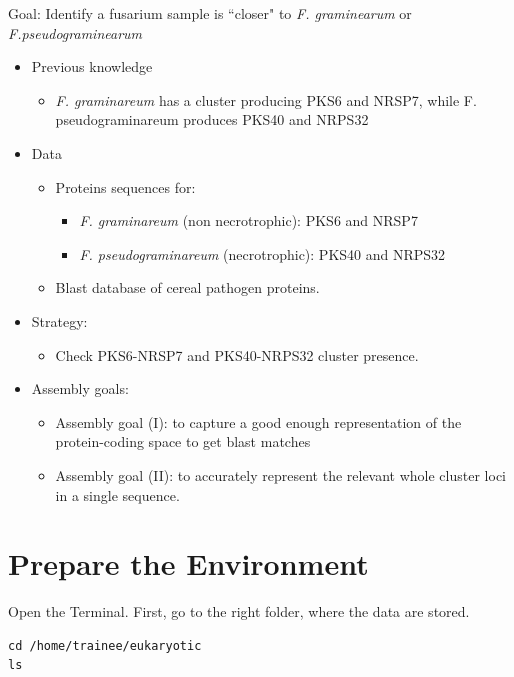 \begin{information}
Goal: Identify a fusarium sample is ``closer" to \textit{F. graminearum} or \textit{F.pseudograminearum}
\begin{itemize}
	\item Previous knowledge
		\begin{itemize}
		\item \textit{F. graminareum} has a cluster producing PKS6 and NRSP7, while F. pseudograminareum produces PKS40 and NRPS32
		\end{itemize}
	\item Data
		\begin{itemize}
		\item Proteins sequences for:
			\begin{itemize}
			\item \textit{F. graminareum} (non necrotrophic): PKS6 and NRSP7
			\item \textit{F. pseudograminareum} (necrotrophic): PKS40 and NRPS32
			\end{itemize}
		\item Blast database of cereal pathogen proteins.
		\end{itemize}
	\item Strategy:
		\begin{itemize}
		\item Check PKS6-NRSP7 and PKS40-NRPS32 cluster presence.
		\end{itemize}
	\item Assembly goals:
		\begin{itemize}
		\item Assembly goal (I): to capture a good enough representation of the protein-coding space to get blast matches
		\item Assembly goal (II): to accurately represent the relevant whole cluster loci in a single sequence.
		\end{itemize}
\end{itemize}

\end{information}

\section{Prepare the Environment}
\begin{steps}
Open the Terminal.
First, go to the right folder, where the data are stored.
\begin{lstlisting}
cd /home/trainee/eukaryotic
ls
\end{lstlisting}
\end{steps}


